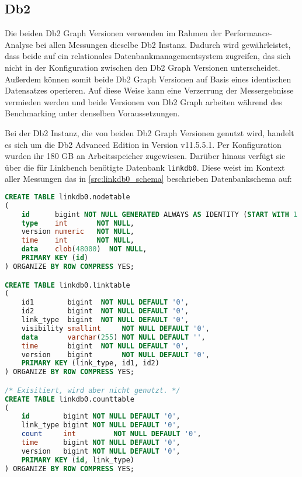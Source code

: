 \subsection{Db2}
Die beiden Db2 Graph Versionen verwenden im Rahmen der Performance-Analyse bei allen Messungen dieselbe Db2 Instanz. Dadurch wird gewährleistet, dass beide auf ein relationales Datenbankmanagementsystem zugreifen, das sich nicht in der Konfiguration zwischen den Db2 Graph Versionen unterscheidet. Außerdem können somit beide Db2 Graph Versionen auf Basis eines identischen Datensatzes operieren. Auf diese Weise kann eine Verzerrung der Messergebnisse vermieden werden und beide Versionen von Db2 Graph arbeiten während des Benchmarking unter denselben Voraussetzungen.

Bei der Db2 Instanz, die von beiden Db2 Graph Versionen genutzt wird, handelt es sich um die Db2 Advanced Edition in Version v11.5.5.1. Per Konfiguration wurden ihr 180 GB an Arbeitsspeicher zugewiesen. Darüber hinaus verfügt sie über die für Linkbench benötigte Datenbank \texttt{linkdb0}. Diese weist im Kontext aller Messungen das in \autoref{src:linkdb0_schema} beschrieben Datenbankschema auf:

\begin{lstlisting}[label=src:linkdb0_schema,caption={Db2 Instanz Datenbankschema für linkdb0},language=SQL]
CREATE TABLE linkdb0.nodetable
(
    id      bigint NOT NULL GENERATED ALWAYS AS IDENTITY (START WITH 1 INCREMENT BY 1),
    type    int       NOT NULL,
    version numeric   NOT NULL,
    time    int       NOT NULL,
    data    clob(48000)  NOT NULL,
    PRIMARY KEY (id)
) ORGANIZE BY ROW COMPRESS YES;

CREATE TABLE linkdb0.linktable
(
    id1        bigint  NOT NULL DEFAULT '0',
    id2        bigint  NOT NULL DEFAULT '0',
    link_type  bigint  NOT NULL DEFAULT '0',
    visibility smallint     NOT NULL DEFAULT '0',
    data       varchar(255) NOT NULL DEFAULT '',
    time       bigint  NOT NULL DEFAULT '0',
    version    bigint       NOT NULL DEFAULT '0',
    PRIMARY KEY (link_type, id1, id2)
) ORGANIZE BY ROW COMPRESS YES;

/* Exisitiert, wird aber nicht genutzt. */
CREATE TABLE linkdb0.counttable
(
    id        bigint NOT NULL DEFAULT '0',
    link_type bigint NOT NULL DEFAULT '0',
    count     int         NOT NULL DEFAULT '0',
    time      bigint NOT NULL DEFAULT '0',
    version   bigint NOT NULL DEFAULT '0',
    PRIMARY KEY (id, link_type)
) ORGANIZE BY ROW COMPRESS YES;
\end{lstlisting}

